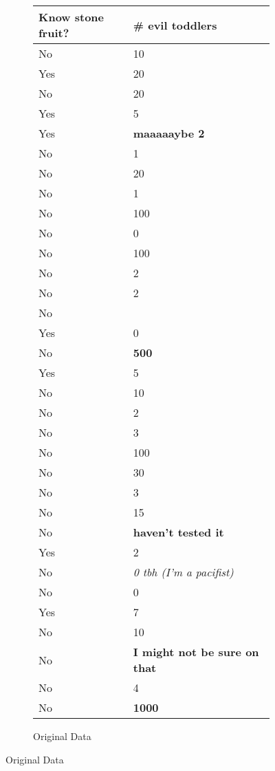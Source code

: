 \documentclass{article}
\begin{document}
\begin{figure}
    \centering
    \caption{Data}
    \label{fig:data}
    \begin{subfigure}{.5\textwidth}
        \centering
        \caption{Original Data}
        \label{subfig:original}
        \begin{tabular}{p{3cm}|p{3cm}}
            \toprule
            Know stone fruit? & \# evil toddlers \\
            \midrule
            No & 10 \\
            Yes & 20 \\
            No & 20 \\
            Yes & 5 \\
            Yes & \bf{maaaaaybe 2} \\
            No & 1 \\
            No & 20 \\
            No & 1 \\
            No & 100 \\
            No & 0 \\
            No & 100 \\
            No & 2 \\
            No & 2 \\
            No \\
            Yes & 0 \\
            No & \bf{500} \\
            Yes & 5 \\
            No & 10 \\
            No & 2 \\
            No & 3 \\
            No & 100 \\
            No & 30 \\
            No & 3 \\
            No & 15 \\
            No & \bf{haven't tested it} \\
            Yes & 2 \\
            No & \textit{0 tbh (I'm a pacifist)} \\
            No & 0 \\
            Yes & 7 \\
            No & 10 \\
            No & \bf{I might not be sure on that} \\
            No & 4 \\
            No & \bf{1000} \\

\end{tabular}
\end{subfigure}
\end{figure}
\end{document}
